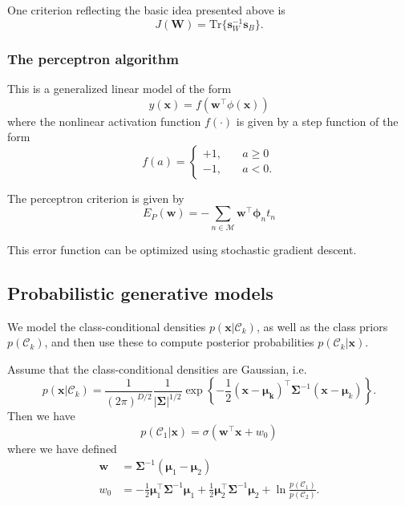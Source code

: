 \documentclass[a4paper]{report}
\newcommand{\up}{\mathrm}
\renewcommand{\bf}{\mathbf}
\renewcommand{\cal}{\mathcal}
\newcommand{\bs}{\boldsymbol}
\begin{document}
One criterion reflecting the basic idea presented above is
\begin{equation}
	J(\bf{W}) = \up{Tr}\{ \bf{s}_W^{-1} \bf{s}_B \}.
\end{equation}
\subsubsection{The perceptron algorithm}
This is a generalized linear model of the form
\begin{equation}
	y(\bf{x}) = f(\bf{w}^{\intercal} \phi(\bf{x}))
\end{equation}
where the nonlinear activation function $f(\cdot)$ is given by a step function of the form
\begin{equation}
	f(a) = \begin{cases}
		+1, \quad & a \geq 0 \\
		-1, \quad & a < 0.
	\end{cases}
\end{equation}

The perceptron criterion is given by
\begin{equation}
	E_P(\bf{w}) = - \sum_{n \in \cal{M}} \bf{w}^{\intercal} \bs{\phi}_n t_n
\end{equation}

This error function can be optimized using stochastic gradient descent.
\subsection{Probabilistic generative models}
We model the class-conditional densities $p(\bf{x}|\cal{C}_k)$, as well as the class priors $p(\cal{C}_k)$, and then use these to compute posterior probabilities $p(\cal{C}_k|\bf{x})$.

Assume that the class-conditional densities are Gaussian, i.e.
\begin{equation}
	p(\bf{x}|\cal{C}_k) = \frac{1}{(2\pi)^{D/2}}\frac{1}{|\bf{\Sigma}|^{1/2}}\exp \left\{ -\frac{1}{2}(\bf{x}-\bs{\mu_k})^{\intercal} \bf{\Sigma}^{-1} (\bf{x}-\bs{\mu}_k) \right\}.
\end{equation}
Then we have
\begin{equation}
	p(\cal{C}_1|\bf{x}) = \sigma(\bf{w}^{\intercal} \bf{x} + w_0)
\end{equation}
where we have defined
\begin{align}
	\bf{w} &= \bf{\Sigma}^{-1} (\bs{\mu}_1 - \bs{\mu}_2) \\
	w_0 &= -\frac{1}{2} \bs{\mu}_1^{\intercal} \bs{\Sigma}^{-1} \bs{\mu}_1 + \frac{1}{2} \bs{\mu}_2^{\intercal} \bs{\Sigma}^{-1} \bs{\mu}_2+\ln \frac{p(\cal{C}_1)}{p(\cal{C}_2)}.
\end{align}
\end{document}
